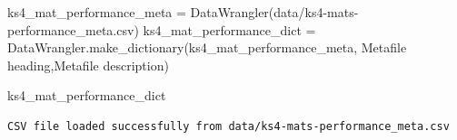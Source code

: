 \documentclass[
  letterpaper,
  DIV=11,
  numbers=noendperiod]{scrartcl}
\newenvironment{Shaded}{\begin{snugshade}}{\end{snugshade}}
\newcommand{\NormalTok}[1]{\textcolor[rgb]{0.00,0.23,0.31}{#1}}
\newcommand{\OperatorTok}[1]{\textcolor[rgb]{0.37,0.37,0.37}{#1}}
\newcommand{\StringTok}[1]{\textcolor[rgb]{0.13,0.47,0.30}{#1}}
\begin{document}
\begin{Shaded}
\begin{Highlighting}[]

\NormalTok{ks4\_mat\_performance\_meta }\OperatorTok{=}\NormalTok{ DataWrangler(}\StringTok{\textquotesingle{}data/ks4{-}mats{-}performance\_meta.csv\textquotesingle{}}\NormalTok{)}
\NormalTok{ks4\_mat\_performance\_dict }\OperatorTok{=}\NormalTok{ DataWrangler.make\_dictionary(ks4\_mat\_performance\_meta, }\StringTok{\textquotesingle{}Metafile heading\textquotesingle{}}\NormalTok{,}\StringTok{\textquotesingle{}Metafile description\textquotesingle{}}\NormalTok{)}

\NormalTok{ks4\_mat\_performance\_dict}
\end{Highlighting}
\end{Shaded}

\begin{verbatim}
CSV file loaded successfully from data/ks4-mats-performance_meta.csv
\end{verbatim}
\end{document}
